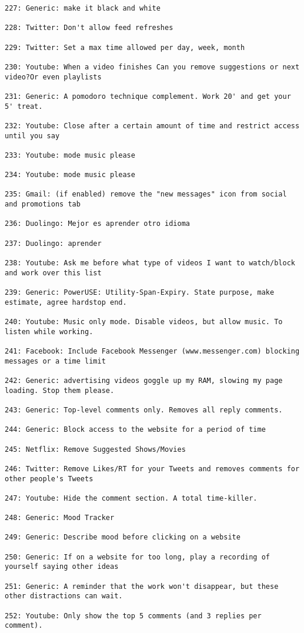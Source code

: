 \begin{lstlisting}[breaklines]
227: Generic: make it black and white

228: Twitter: Don't allow feed refreshes

229: Twitter: Set a max time allowed per day, week, month

230: Youtube: When a video finishes Can you remove suggestions or next video?Or even playlists

231: Generic: A pomodoro technique complement. Work 20' and get your 5' treat.

232: Youtube: Close after a certain amount of time and restrict access until you say

233: Youtube: mode music please

234: Youtube: mode music please

235: Gmail: (if enabled) remove the "new messages" icon from social and promotions tab

236: Duolingo: Mejor es aprender otro idioma

237: Duolingo: aprender

238: Youtube: Ask me before what type of videos I want to watch/block and work over this list

239: Generic: PowerUSE: Utility-Span-Expiry. State purpose, make estimate, agree hardstop end.

240: Youtube: Music only mode. Disable videos, but allow music. To listen while working.

241: Facebook: Include Facebook Messenger (www.messenger.com) blocking messages or a time limit

242: Generic: advertising videos goggle up my RAM, slowing my page loading. Stop them please.

243: Generic: Top-level comments only. Removes all reply comments.

244: Generic: Block access to the website for a period of time

245: Netflix: Remove Suggested Shows/Movies

246: Twitter: Remove Likes/RT for your Tweets and removes comments for other people's Tweets

247: Youtube: Hide the comment section. A total time-killer.

248: Generic: Mood Tracker

249: Generic: Describe mood before clicking on a website

250: Generic: If on a website for too long, play a recording of yourself saying other ideas

251: Generic: A reminder that the work won't disappear, but these other distractions can wait.

252: Youtube: Only show the top 5 comments (and 3 replies per comment).
\end{lstlisting}
